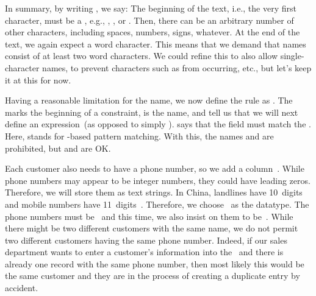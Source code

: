 In summary, by writing , we say:
The beginning of the text, i.e., the very first character, must be a , e.g., , , or .
Then, there can be an arbitrary number of other characters, including spaces, numbers, signs, whatever.
At the end of the text, we again expect a word character.
This means that we demand that names consist of at least two word characters.
We could refine this to also allow single-character names, to prevent characters such as  from occurring, etc., but let's keep it at this for now.%
%
\begin{sloppypar}%
Having a reasonable limitation for the name, we now define the rule  as \sqlIdx{\$}\sqlIdx{\textasciicircum}\sqlIdx{\textasciitilde}.
The  marks the beginning of a constraint,  is the name, and  tell us that we will next define an expression~(as opposed to simply ).
\sqlIdx{\$}\sqlIdx{\textasciicircum}\sqlIdx{\textasciitilde} says that the field  must match the  .
Here, \sqlil{\~}\sqlIdx{\textasciitilde} stands for -based pattern matching.
With this, the names  and  are prohibited, but  and  are OK.%
\end{sloppypar}%
%
Each customer also needs to have a phone number, so we add a column~.
While phone numbers may appear to be integer numbers, they could have leading zeros.
Therefore, we will store them as text strings.
In China, landlines have 10~digits and mobile numbers have 11~digits~\cite{BD2006BDBK:MPNANSBTTMDFMP}.
Therefore, we choose~ as the datatype.
The phone numbers must be~ and this time, we also insist on them to be~.
While there might be two different customers with the same name, we do not permit two different customers having the same phone number.
Indeed, if our sales department wants to enter a customer's information into the \db\ and there is already one record with the same phone number, then most likely this would be the same customer and they are in the process of creating a duplicate entry by accident.

